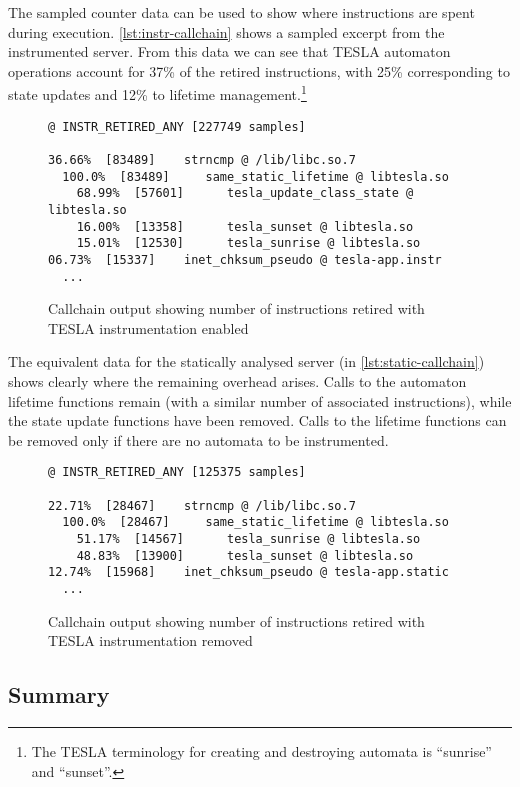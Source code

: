 The sampled counter data can be used to show where instructions are
spent during execution. \autoref{lst:instr-callchain} shows a sampled
excerpt from the instrumented server. From this data we can see that
TESLA automaton operations account for 37\% of the retired instructions,
with 25\% corresponding to state updates and 12\% to lifetime
management.\footnote{The TESLA terminology for creating and destroying
automata is ``sunrise'' and ``sunset''.}

\begin{figure}[ht]
  \begin{verbatim}
@ INSTR_RETIRED_ANY [227749 samples]

36.66%  [83489]    strncmp @ /lib/libc.so.7
  100.0%  [83489]     same_static_lifetime @ libtesla.so
    68.99%  [57601]      tesla_update_class_state @ libtesla.so
    16.00%  [13358]      tesla_sunset @ libtesla.so
    15.01%  [12530]      tesla_sunrise @ libtesla.so
06.73%  [15337]    inet_chksum_pseudo @ tesla-app.instr
  ...
  \end{verbatim}
  \caption{Callchain output showing number of instructions retired with
  TESLA instrumentation enabled}
  \label{lst:instr-callchain}
\end{figure}

The equivalent data for the statically analysed server (in
\autoref{lst:static-callchain}) shows clearly where the remaining
overhead arises. Calls to the automaton lifetime functions remain (with
a similar number of associated instructions), while the state update
functions have been removed. Calls to the lifetime functions can be
removed only if there are no automata to be instrumented.

\begin{figure}[ht]
  \begin{verbatim}
@ INSTR_RETIRED_ANY [125375 samples]

22.71%  [28467]    strncmp @ /lib/libc.so.7
  100.0%  [28467]     same_static_lifetime @ libtesla.so
    51.17%  [14567]      tesla_sunrise @ libtesla.so
    48.83%  [13900]      tesla_sunset @ libtesla.so
12.74%  [15968]    inet_chksum_pseudo @ tesla-app.static
  ...
  \end{verbatim}
  \caption{Callchain output showing number of instructions retired with
  TESLA instrumentation removed}
  \label{lst:static-callchain}
\end{figure}

\subsection{Summary}

